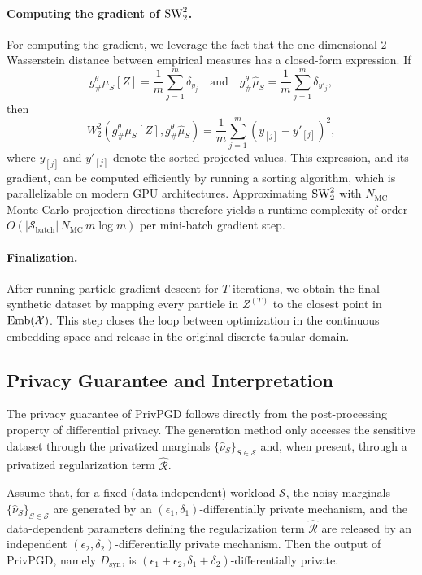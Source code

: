 \paragraph{Computing the gradient of \(\operatorname{SW}_2^2\).}
For computing the gradient, we leverage the fact that the one-dimensional \(2\)-Wasserstein distance between empirical measures has a closed-form expression. If
\[
  g^\theta_{\#}\mu_S[Z] = \frac{1}{m}\sum_{j=1}^m \delta_{y_j}
  \quad\text{and}\quad
  g^\theta_{\#}\hat{\mu}_S = \frac{1}{m}\sum_{j=1}^m \delta_{y'_j},
\]
then
\[
  W_2^2\!\left(g^\theta_{\#}\mu_S[Z],g^\theta_{\#}\hat{\mu}_S\right)
  =
  \frac{1}{m}\sum_{j=1}^m (y_{[j]} - y'_{[j]})^2,
\]
where \(y_{[j]}\) and \(y'_{[j]}\) denote the sorted projected values. This expression, and its gradient, can be computed efficiently by running a sorting algorithm, which is parallelizable on modern GPU architectures. Approximating \(\operatorname{SW}_2^2\) with \(N_{\mathrm{MC}}\) Monte Carlo projection directions therefore yields a runtime complexity of order \(O(|\mathcal{S}_{\mathrm{batch}}|\,N_{\mathrm{MC}}\,m\log m)\) per mini-batch gradient step.

\paragraph{Finalization.}
After running particle gradient descent for \(T\) iterations, we obtain the final synthetic dataset by mapping every particle in \(Z^{(T)}\) to the closest point in \(\operatorname{Emb}(\mathcal{X})\). This step closes the loop between optimization in the continuous embedding space and release in the original discrete tabular domain.

\subsection{Privacy Guarantee and Interpretation}

The privacy guarantee of PrivPGD follows directly from the post-processing property of differential privacy. The generation method only accesses the sensitive dataset through the privatized marginals \(\{\hat{\nu}_S\}_{S \in \mathcal{S}}\) and, when present, through a privatized regularization term \(\hat{\mathcal{R}}\).

\begin{lemma}
\label{lem:privpgd-privacy}
Assume that, for a fixed (data-independent) workload \(\mathcal{S}\), the noisy marginals \(\{\hat{\nu}_S\}_{S \in \mathcal{S}}\) are generated by an \((\epsilon_1,\delta_1)\)-differentially private mechanism, and the data-dependent parameters defining the regularization term \(\hat{\mathcal{R}}\) are released by an independent \((\epsilon_2,\delta_2)\)-differentially private mechanism. Then the output of PrivPGD, namely \(D_{\mathrm{syn}}\), is \((\epsilon_1+\epsilon_2,\delta_1+\delta_2)\)-differentially private.
\end{lemma}

